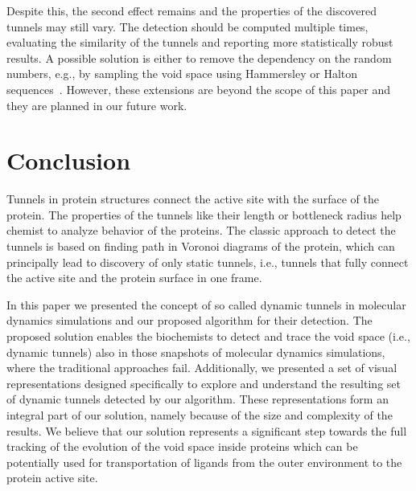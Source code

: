 \documentclass[usletter, 10pt, conference]{svjour3}      %
\begin{document}
Despite this, the second effect remains and the properties of the discovered tunnels may still vary.
The detection should be computed multiple times, evaluating the similarity of the tunnels and reporting more statistically robust results.
A possible solution is either to remove the dependency on the random numbers, e.g., by sampling the void space using Hammersley or Halton sequences~\cite{Lav06,branickyQuasi,rosell2007general}.
However, these extensions are beyond the scope of this paper and they are planned in our future work.










\section{Conclusion }

Tunnels in protein structures connect the active site with the surface of the protein.
The properties of the tunnels like their length or bottleneck radius help chemist to analyze behavior of the proteins.
The classic approach to detect the tunnels is based on finding path in Voronoi diagrams of the protein, which can principally
lead to discovery of only static tunnels, i.e., tunnels that fully connect the active site and the protein surface in one frame.

In this paper we presented the concept of so called dynamic tunnels in molecular dynamics simulations and our proposed algorithm for their detection.
The proposed solution enables the biochemists to detect and trace the void space (i.e., dynamic tunnels) also in those snapshots of molecular dynamics simulations, where the traditional approaches fail.
Additionally, we presented a set of visual representations designed specifically to explore and understand the resulting set of dynamic tunnels detected by our algorithm. 
These representations form an integral part of our solution, namely because of the size and complexity of the results. 
We believe that our solution represents a significant step towards the full tracking of the evolution of the void space inside proteins which can be potentially used for transportation of ligands from the outer environment to the protein active site.
\end{document}
